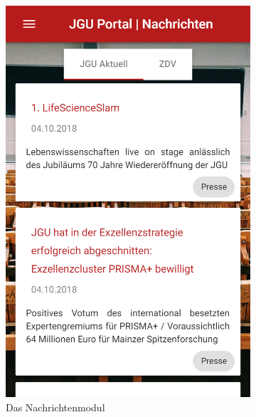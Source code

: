 \begin{figure}
\begin{subfigure}{.5\textwidth}
  \centering
  \includegraphics[width=.8\linewidth]{gfx/NewsFeed}
  \caption{Das Nachrichtenmodul}
  \label{fig:news}
\end{subfigure}%
\begin{subfigure}{.5\textwidth}
  \centering

\end{subfigure}
\end{figure}
